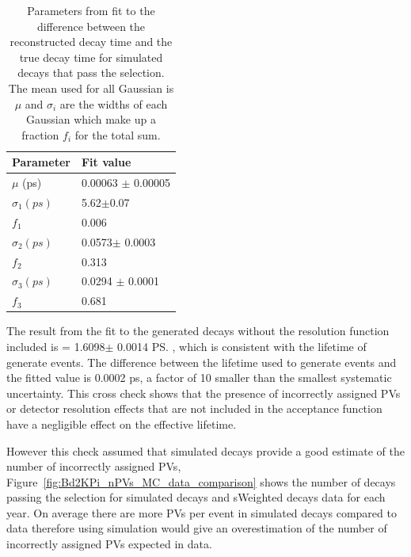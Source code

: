 \begin{table}[ht]
\begin{center}
\begin{tabular}{|l|l|}
\hline
Parameter               & Fit value             \\ \hline
$\mu$ (ps)              & 0.00063 $\pm$ 0.00005 \\ \hline
$\sigma_{1} (ps)$       & 5.62$\pm$0.07         \\ 
$f_{1}$                 & 0.006               \\ \hline
$\sigma_{2} (ps)$       & 0.0573$\pm$ 0.0003    \\ 
$f_{2}$                 & 0.313                \\ \hline
$\sigma_{3} (ps)$       & 0.0294 $\pm$ 0.0001   \\ 
$f_{3}$                 & 0.681                \\ \hline
\end{tabular}
\vspace{0.7cm}                                                                                    
\caption{Parameters from fit to the difference between the reconstructed decay time and the true decay time for simulated decays that pass the \bsmumu \el selection. The mean used for all Gaussian is $\mu$ and $\sigma_{i}$ are the widths of each Gaussian which make up a fraction $f_{i}$ for the total sum.}
\label{tab:resolutionfit}
\end{center}
\vspace{-1.0cm}                                                                                   
\end{table}


The result from the fit to the generated decays without the resolution function included is  \tmumu = 1.6098$\pm$ 0.0014 \ps, which is consistent with the lifetime of generate events. The difference between the lifetime used to generate events and the fitted value is 0.0002 ps, a factor of 10 smaller than the smallest systematic uncertainty. This cross check shows that the presence of incorrectly assigned PVs or detector resolution effects that are not included in the acceptance function have a negligible effect on the \bsmumu effective lifetime.



However this check assumed that simulated decays provide a good estimate of the number of incorrectly assigned PVs, Figure~\ref{fig:Bd2KPi_nPVs_MC_data_comparison} shows the number of \bdkpi decays passing the selection for simulated \bdkpi decays and sWeighted decays data for each year. On average there are more PVs per event in simulated decays compared to data therefore using simulation would give an overestimation of the number of incorrectly assigned PVs expected in data. 

